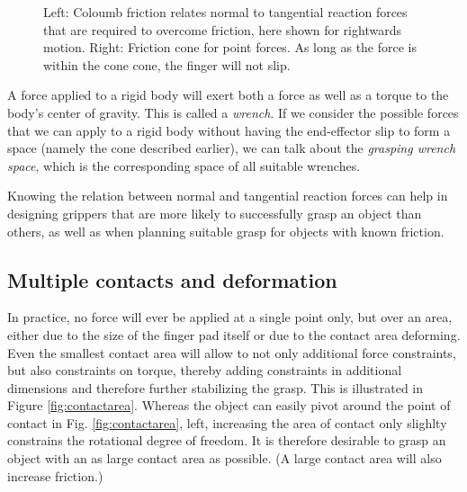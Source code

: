 \begin{figure}
\caption{Left: Coloumb friction relates normal to tangential reaction forces that are required to overcome friction, here shown for rightwards motion. Right: Friction cone for point forces. As long as the force is within the cone cone, the finger will not slip.} 
\end{figure}

A force applied to a rigid body will exert both a force as well as a torque to the body's center of gravity. This is called a \emph{wrench}. If we consider the possible forces that we can apply to a rigid body without having the end-effector slip to form a space (namely the cone described earlier), we can talk about the \emph{grasping wrench space}, which is the corresponding space of all suitable wrenches.

Knowing the relation between normal and tangential reaction forces can help in designing grippers that are more likely to successfully grasp an object than others, as well as when planning suitable grasp for objects with known friction. 


\subsection{Multiple contacts and deformation}
In practice, no force will ever be applied at a single point only, but over an area, either due to the size of the finger pad itself or due to the contact area deforming. Even the smallest contact area will allow to not only additional force constraints, but also constraints on torque, thereby adding constraints in additional dimensions and therefore further stabilizing the grasp. This is illustrated in Figure \ref{fig:contactarea}. Whereas the object can easily pivot around the point of contact in Fig. \ref{fig:contactarea}, left, increasing the area of contact only slighlty constrains the rotational degree of freedom. It is therefore desirable to grasp an object with an as large contact area as possible. (A large contact area will also increase friction.)

